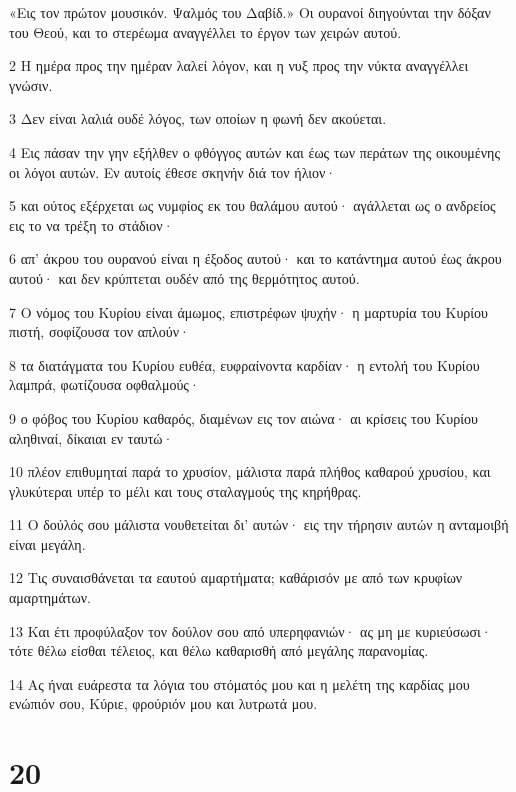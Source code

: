 \par «Εις τον πρώτον μουσικόν. Ψαλμός του Δαβίδ.» Οι ουρανοί διηγούνται την δόξαν του Θεού, και το στερέωμα αναγγέλλει το έργον των χειρών αυτού.
\par 2 Η ημέρα προς την ημέραν λαλεί λόγον, και η νυξ προς την νύκτα αναγγέλλει γνώσιν.
\par 3 Δεν είναι λαλιά ουδέ λόγος, των οποίων η φωνή δεν ακούεται.
\par 4 Εις πάσαν την γην εξήλθεν ο φθόγγος αυτών και έως των περάτων της οικουμένης οι λόγοι αυτών. Εν αυτοίς έθεσε σκηνήν διά τον ήλιον·
\par 5 και ούτος εξέρχεται ως νυμφίος εκ του θαλάμου αυτού· αγάλλεται ως ο ανδρείος εις το να τρέξη το στάδιον·
\par 6 απ' άκρου του ουρανού είναι η έξοδος αυτού· και το κατάντημα αυτού έως άκρου αυτού· και δεν κρύπτεται ουδέν από της θερμότητος αυτού.
\par 7 Ο νόμος του Κυρίου είναι άμωμος, επιστρέφων ψυχήν· η μαρτυρία του Κυρίου πιστή, σοφίζουσα τον απλούν·
\par 8 τα διατάγματα του Κυρίου ευθέα, ευφραίνοντα καρδίαν· η εντολή του Κυρίου λαμπρά, φωτίζουσα οφθαλμούς·
\par 9 ο φόβος του Κυρίου καθαρός, διαμένων εις τον αιώνα· αι κρίσεις του Κυρίου αληθιναί, δίκαιαι εν ταυτώ·
\par 10 πλέον επιθυμηταί παρά το χρυσίον, μάλιστα παρά πλήθος καθαρού χρυσίου, και γλυκύτεραι υπέρ το μέλι και τους σταλαγμούς της κηρήθρας.
\par 11 Ο δούλός σου μάλιστα νουθετείται δι' αυτών· εις την τήρησιν αυτών η ανταμοιβή είναι μεγάλη.
\par 12 Τις συναισθάνεται τα εαυτού αμαρτήματα; καθάρισόν με από των κρυφίων αμαρτημάτων.
\par 13 Και έτι προφύλαξον τον δούλον σου από υπερηφανιών· ας μη με κυριεύσωσι· τότε θέλω είσθαι τέλειος, και θέλω καθαρισθή από μεγάλης παρανομίας.
\par 14 Ας ήναι ευάρεστα τα λόγια του στόματός μου και η μελέτη της καρδίας μου ενώπιόν σου, Κύριε, φρούριόν μου και λυτρωτά μου.

\chapter{20}

